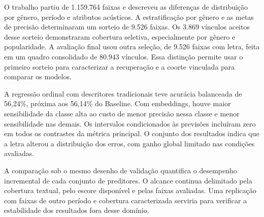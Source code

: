 O trabalho partiu de 1.159.764 faixas e descreveu as diferenças de distribuição por gênero, período e atributos acústicos. A estratificação por gênero e as metas de precisão determinaram um sorteio de 9.526 faixas. Os 3.869 vínculos aceitos desse sorteio demonstraram cobertura seletiva, especialmente por gênero e popularidade. A avaliação final usou outra seleção, de 9.526 faixas com letra, feita em um quadro consolidado de 80.943 vínculos. Essa distinção permite usar o primeiro sorteio para caracterizar a recuperação e a coorte vinculada para comparar os modelos.

A regressão ordinal com descritores tradicionais teve acurácia balanceada de 56,24\%, próxima aos 56,14\% do Baseline. Com embeddings, houve maior sensibilidade da classe alta ao custo de menor precisão nessa classe e menor sensibilidade nas demais. Os intervalos condicionados às previsões incluíram zero em todos os contrastes da métrica principal. O conjunto dos resultados indica que a letra alterou a distribuição dos erros, com ganho global limitado nas condições avaliadas.

A comparação sob o mesmo desenho de validação quantifica o desempenho incremental de cada conjunto de preditores. O alcance continua delimitado pela cobertura textual, pelo escore disponível e pelas faixas avaliadas. Uma replicação com faixas de outro período e cobertura caracterizada serviria para verificar a estabilidade dos resultados fora desse domínio.

